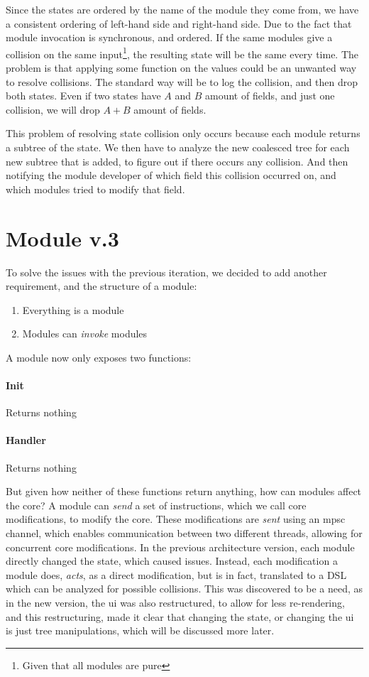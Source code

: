 Since the states are ordered by the name of the module they come from, we
have a consistent ordering of left-hand side and right-hand side. Due to the
fact that module invocation is synchronous, and ordered. If the same modules
give a collision on the same input\footnote{Given that all modules are pure}, the
resulting state will be the same every time. The problem is that applying some
function on the values could be an unwanted way to resolve collisions. The
standard way will be to log the collision, and then drop both states. Even
if two states have $A$ and $B$ amount of fields, and just one collision, we will
drop $A + B$ amount of fields.

This problem of resolving state collision only occurs because each module
returns a subtree of the state. We then have to analyze the new coalesced tree
for each new subtree that is added, to figure out if there occurs any collision.
And then notifying the module developer of which field this collision occurred
on, and which modules tried to modify that field.


\section{Module v.3} \label{sec:moD3}

To solve the issues with the previous iteration, we decided to add another
requirement, and the structure of a module:

\begin{enumerate}
  \item Everything is a module
  \item Modules can \textit{invoke} modules
\end{enumerate}

A module now only exposes two functions:

\paragraph{Init} Returns nothing

\paragraph{Handler} Returns nothing

But given how neither of these functions return anything, how can modules affect
the core? A module can \textit{send} a set of instructions, which we call core
modifications, to modify the core. These modifications are \textit{sent} using
an \gls*{mpsc} channel, which enables communication between two different
threads, allowing for concurrent core modifications. In the previous
architecture version, each module directly changed the state, which caused
issues. Instead, each modification a module does, \textit{acts}, as a direct
modification, but is in fact, translated to a DSL which can be analyzed for
possible collisions. This was discovered to be a need, as in the new version,
the \gls*{ui} was also restructured, to allow for less re-rendering, and this
restructuring, made it clear that changing the state, or changing the \gls*{ui}
is just tree manipulations, which will be discussed more later.

